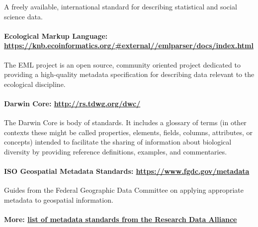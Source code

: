 A freely available, international standard for describing statistical
and social science data.

\paragraph{\texorpdfstring{Ecological Markup Language:
\url{https://knb.ecoinformatics.org/\#external//emlparser/docs/index.html}}{Ecological Markup Language: https://knb.ecoinformatics.org/\#external//emlparser/docs/index.html}}\label{ecological-markup-language-httpsknb.ecoinformatics.orgexternalemlparserdocsindex.html}

The EML project is an open source, community oriented project dedicated
to providing a high-quality metadata specification for describing data
relevant to the ecological discipline.

\paragraph{\texorpdfstring{Darwin Core:
\url{http://rs.tdwg.org/dwc/}}{Darwin Core: http://rs.tdwg.org/dwc/}}\label{darwin-core-httprs.tdwg.orgdwc}

The Darwin Core is body of standards. It includes a glossary of terms
(in other contexts these might be called properties, elements, fields,
columns, attributes, or concepts) intended to facilitate the sharing of
information about biological diversity by providing reference
definitions, examples, and commentaries.

\paragraph{\texorpdfstring{ISO Geospatial Metadata Standards:
\url{https://www.fgdc.gov/metadata}}{ISO Geospatial Metadata Standards: https://www.fgdc.gov/metadata}}\label{iso-geospatial-metadata-standards-httpswww.fgdc.govmetadata}

Guides from the Federal Geographic Data Committee on applying
appropriate metadata to geospatial information.

\paragraph{\texorpdfstring{More:
\href{http://rd-alliance.github.io/metadata-directory/}{list of metadata
standards from the Research Data
Alliance}}{More: list of metadata standards from the Research Data Alliance}}\label{more-list-of-metadata-standards-from-the-research-data-alliance}

